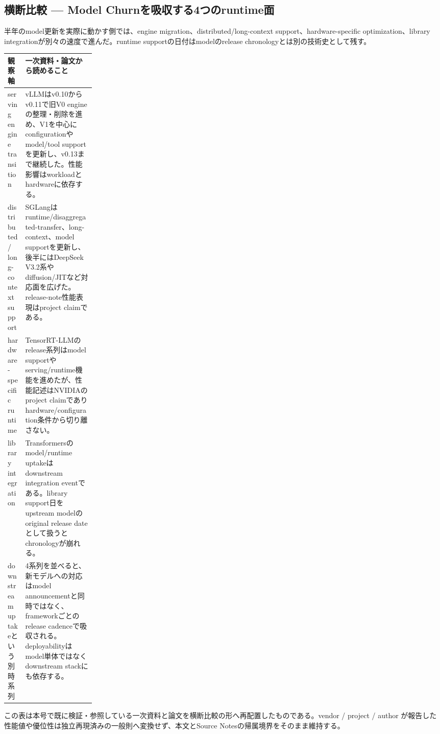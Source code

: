 \subsection*{横断比較 — Model Churnを吸収する4つのruntime面}
半年のmodel更新を実際に動かす側では、engine migration、distributed/long-context support、hardware-specific optimization、library integrationが別々の速度で進んだ。runtime supportの日付はmodelのrelease chronologyとは別の技術史として残す。
\medskip
\begin{center}
\small
\renewcommand{\arraystretch}{1.16}
\begin{tabularx}{\linewidth}{@{}p{0.20\linewidth}X@{}}
\toprule
観察軸 & 一次資料・論文から読めること \\
\midrule
serving engine transition & vLLMはv0.10からv0.11で旧V0 engineの整理・削除を進め、V1を中心にconfigurationやmodel/tool supportを更新し、v0.13まで継続した。性能影響はworkloadとhardwareに依存する。 \cite{src-43eaa2f12960,src-58ef6e84aa65,src-455a78bc36fa} \\
distributed / long-context support & SGLangはruntime/disaggregated-transfer、long-context、model supportを更新し、後半にはDeepSeek V3.2系やdiffusion/JITなど対応面を広げた。release-note性能表現はproject claimである。 \cite{src-4197b73cea93,src-ee0eb9562688} \\
hardware-specific runtime & TensorRT-LLMのrelease系列はmodel supportやserving/runtime機能を進めたが、性能記述はNVIDIAのproject claimでありhardware/configuration条件から切り離さない。 \cite{src-283a52c58291,src-04b5c0f10b59} \\
library integration & Transformersのmodel/runtime uptakeはdownstream integration eventである。library support日をupstream modelのoriginal release dateとして扱うとchronologyが崩れる。 \cite{src-a783d282600b,src-d4b1979540fd,src-2595cdd4fabc} \\
downstream uptakeという別時系列 & 4系列を並べると、新モデルへの対応はmodel announcementと同時ではなく、frameworkごとのrelease cadenceで吸収される。deployabilityはmodel単体ではなくdownstream stackにも依存する。 \cite{src-43eaa2f12960,src-58ef6e84aa65,src-455a78bc36fa,src-a783d282600b,src-d4b1979540fd,src-2595cdd4fabc} \\
\bottomrule
\end{tabularx}
\renewcommand{\arraystretch}{1.0}
\end{center}
\normalsize
\begin{claimboundary}[この比較の境界]
この表は本号で既に検証・参照している一次資料と論文を横断比較の形へ再配置したものである。vendor / project / author が報告した性能値や優位性は独立再現済みの一般則へ変換せず、本文とSource Notesの帰属境界をそのまま維持する。
\end{claimboundary}
